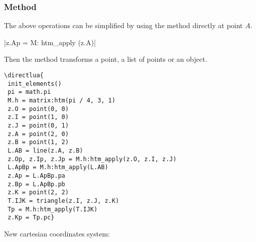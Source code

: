 \subsubsection{Method }
\label{ssub:method_code_htm__apply}
The above operations can be simplified by using the  method directly at point $A$.

\begin{mybox}
|z.Ap = M: htm_apply (z.A)|\\
\end{mybox}

Then the method  transforms a point, a list of points or an object.


\begin{minipage}{.6\textwidth}
\begin{verbatim}
\directlua{
 init_elements()
 pi = math.pi
 M.h = matrix:htm(pi / 4, 3, 1)
 z.O = point(0, 0)
 z.I = point(1, 0)
 z.J = point(0, 1)
 z.A = point(2, 0)
 z.B = point(1, 2)
 L.AB = line(z.A, z.B)
 z.Op, z.Ip, z.Jp = M.h:htm_apply(z.O, z.I, z.J)
 L.ApBp = M.h:htm_apply(L.AB)
 z.Ap = L.ApBp.pa
 z.Bp = L.ApBp.pb
 z.K = point(2, 2)
 T.IJK = triangle(z.I, z.J, z.K)
 Tp = M.h:htm_apply(T.IJK)
 z.Kp = Tp.pc}
\end{verbatim}
\end{minipage}
\begin{minipage}{.4\textwidth}
\end{minipage}

\vspace{.5 em}

New  cartesian coordinates system:

